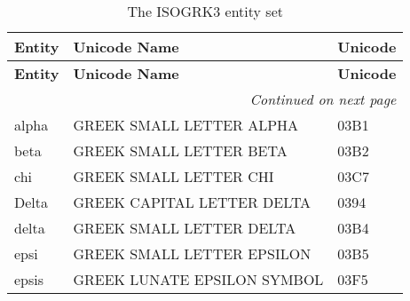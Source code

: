 \documentclass{article}
\begin{document}
\begin{longtable}{lll}
\caption{The ISOGRK3 entity set}\\
\bfseries Entity&\bfseries Unicode Name&\bfseries Unicode\\ \hline
\endfirsthead
\bfseries Entity&\bfseries Unicode Name&\bfseries Unicode\\ \hline
\endhead
\hline \multicolumn{3}{r}{\emph{Continued on next page}}\\
\endfoot
\hline
\endlastfoot
alpha  & GREEK SMALL LETTER ALPHA      & 03B1\\
beta   & GREEK SMALL LETTER BETA       & 03B2\\
chi    & GREEK SMALL LETTER CHI        & 03C7\\
Delta  & GREEK CAPITAL LETTER DELTA    & 0394\\
delta  & GREEK SMALL LETTER DELTA      & 03B4\\
epsi   & GREEK SMALL LETTER EPSILON    & 03B5\\
epsis  & GREEK LUNATE EPSILON SYMBOL   & 03F5\\
\end{longtable}
\end{document}
